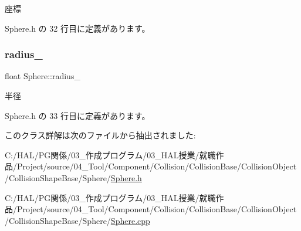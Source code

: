 座標 



 Sphere.\+h の 32 行目に定義があります。

\mbox{\label{class_sphere_ac2924d9ad22bfad1ed1914c069c188dc}} 
\subsubsection{\texorpdfstring{radius\+\_\+}{radius\_}}
{\footnotesize\ttfamily float Sphere\+::radius\+\_\+\hspace{0.3cm}{\ttfamily [private]}}



半径 



 Sphere.\+h の 33 行目に定義があります。



このクラス詳解は次のファイルから抽出されました\+:\begin{DoxyCompactItemize}
\item 
C\+:/\+H\+A\+L/\+P\+G関係/03\+\_\+作成プログラム/03\+\_\+\+H\+A\+L授業/就職作品/\+Project/source/04\+\_\+\+Tool/\+Component/\+Collision/\+Collision\+Base/\+Collision\+Object/\+Collision\+Shape\+Base/\+Sphere/\mbox{\hyperlink{_sphere_8h}{Sphere.\+h}}\item 
C\+:/\+H\+A\+L/\+P\+G関係/03\+\_\+作成プログラム/03\+\_\+\+H\+A\+L授業/就職作品/\+Project/source/04\+\_\+\+Tool/\+Component/\+Collision/\+Collision\+Base/\+Collision\+Object/\+Collision\+Shape\+Base/\+Sphere/\mbox{\hyperlink{_sphere_8cpp}{Sphere.\+cpp}}\end{DoxyCompactItemize}
